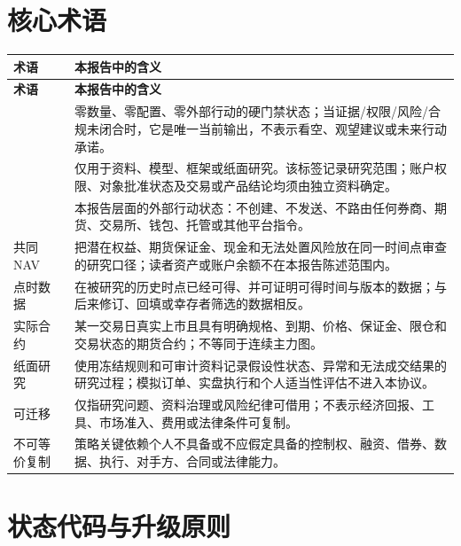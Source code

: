 \section{核心术语}

\begin{longtable}{L{3.3cm} L{10.0cm}}
\toprule
\textbf{术语} & \textbf{本报告中的含义} \\
\midrule
\endfirsthead
\toprule
\textbf{术语} & \textbf{本报告中的含义} \\
\midrule
\endhead
\qzero{} & 零数量、零配置、零外部行动的硬门禁状态；当证据/权限/风险/合规未闭合时，它是唯一当前输出，不表示看空、观望建议或未来行动承诺。 \\
\researchonly{} & 仅用于资料、模型、框架或纸面研究。该标签记录研究范围；账户权限、对象批准状态及交易或产品结论均须由独立资料确定。 \\
\noaction{} & 本报告层面的外部行动状态：不创建、不发送、不路由任何券商、期货、交易所、钱包、托管或其他平台指令。 \\
共同 NAV & 把潜在权益、期货保证金、现金和无法处置风险放在同一时间点审查的研究口径；读者资产或账户余额不在本报告陈述范围内。 \\
点时数据 & 在被研究的历史时点已经可得、并可证明可得时间与版本的数据；与后来修订、回填或幸存者筛选的数据相反。 \\
实际合约 & 某一交易日真实上市且具有明确规格、到期、价格、保证金、限仓和交易状态的期货合约；不等同于连续主力图。 \\
纸面研究 & 使用冻结规则和可审计资料记录假设性状态、异常和无法成交结果的研究过程；模拟订单、实盘执行和个人适当性评估不进入本协议。 \\
可迁移 & 仅指研究问题、资料治理或风险纪律可借用；不表示经济回报、工具、市场准入、费用或法律条件可复制。 \\
不可等价复制 & 策略关键依赖个人不具备或不应假定具备的控制权、融资、借券、数据、执行、对手方、合同或法律能力。 \\
\bottomrule
\end{longtable}

\section{状态代码与升级原则}

